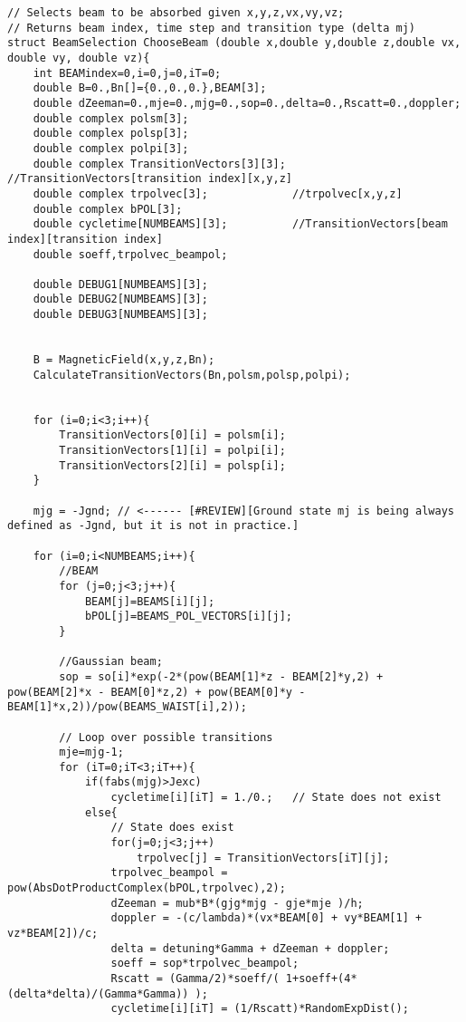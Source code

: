 \begin{lstlisting}[style=CStyle]
// Selects beam to be absorbed given x,y,z,vx,vy,vz;
// Returns beam index, time step and transition type (delta mj)
struct BeamSelection ChooseBeam (double x,double y,double z,double vx, double vy, double vz){
    int BEAMindex=0,i=0,j=0,iT=0;
    double B=0.,Bn[]={0.,0.,0.},BEAM[3];
    double dZeeman=0.,mje=0.,mjg=0.,sop=0.,delta=0.,Rscatt=0.,doppler;
    double complex polsm[3];
    double complex polsp[3];
    double complex polpi[3];
    double complex TransitionVectors[3][3]; //TransitionVectors[transition index][x,y,z]
    double complex trpolvec[3];             //trpolvec[x,y,z]
    double complex bPOL[3];
    double cycletime[NUMBEAMS][3];          //TransitionVectors[beam index][transition index]
    double soeff,trpolvec_beampol;

    double DEBUG1[NUMBEAMS][3];
    double DEBUG2[NUMBEAMS][3];
    double DEBUG3[NUMBEAMS][3];


    B = MagneticField(x,y,z,Bn);
    CalculateTransitionVectors(Bn,polsm,polsp,polpi);


    for (i=0;i<3;i++){
        TransitionVectors[0][i] = polsm[i];
        TransitionVectors[1][i] = polpi[i];
        TransitionVectors[2][i] = polsp[i];
    }

    mjg = -Jgnd; // <------ [#REVIEW][Ground state mj is being always defined as -Jgnd, but it is not in practice.]

    for (i=0;i<NUMBEAMS;i++){
        //BEAM
        for (j=0;j<3;j++){
            BEAM[j]=BEAMS[i][j];
            bPOL[j]=BEAMS_POL_VECTORS[i][j];
        }

        //Gaussian beam;
        sop = so[i]*exp(-2*(pow(BEAM[1]*z - BEAM[2]*y,2) + pow(BEAM[2]*x - BEAM[0]*z,2) + pow(BEAM[0]*y - BEAM[1]*x,2))/pow(BEAMS_WAIST[i],2));

        // Loop over possible transitions
        mje=mjg-1;
        for (iT=0;iT<3;iT++){
            if(fabs(mjg)>Jexc)
                cycletime[i][iT] = 1./0.;   // State does not exist
            else{
                // State does exist
                for(j=0;j<3;j++)
                    trpolvec[j] = TransitionVectors[iT][j];
                trpolvec_beampol = pow(AbsDotProductComplex(bPOL,trpolvec),2);
                dZeeman = mub*B*(gjg*mjg - gje*mje )/h;
                doppler = -(c/lambda)*(vx*BEAM[0] + vy*BEAM[1] + vz*BEAM[2])/c;
                delta = detuning*Gamma + dZeeman + doppler;
                soeff = sop*trpolvec_beampol;
                Rscatt = (Gamma/2)*soeff/( 1+soeff+(4*(delta*delta)/(Gamma*Gamma)) );
                cycletime[i][iT] = (1/Rscatt)*RandomExpDist();


\end{lstlisting}
